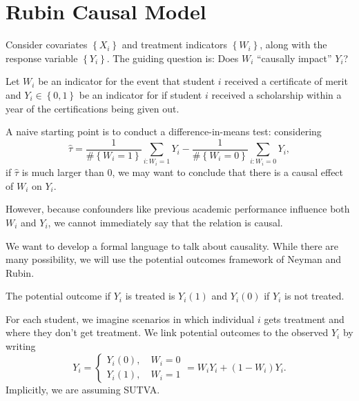 
\section{Rubin Causal Model}



Consider covariates $\left\{X_i\right\}$ and treatment indicators $\left\{W_i\right\}$, along with the response variable $\left\{Y_i\right\}$. The guiding question is: Does $W_i$ ``causally impact'' $Y_i$?

\begin{example}	Let $W_i$ be an indicator for the event that student $i$ received a certificate of merit and $Y_i \in \left\{0,1\right\}$ be an indicator for if student $i$ received a scholarship within a year of the certifications being given out.

	A naive starting point is to conduct a difference-in-means test: considering \[
		\hat{\tau} = \frac{1}{\# \left\{W_i = 1\right\}} \sum\limits_{i: W_i = 1}^{} Y_i - \frac{1}{\# \left\{W_i = 0\right\}} \sum\limits_{i: W_i = 0}^{} Y_i
	,\] 
	if $\hat{\tau}$ is much larger than $0$, we may want to conclude that there is a causal effect of $W_i$ on $Y_i$. 

	However, because confounders like previous academic performance influence both $W_i$ and $Y_i$, we cannot immediately say that the relation is causal.
\end{example}

We want to develop a formal language to talk about causality. While there are many possibility, we will use the potential outcomes framework of Neyman and Rubin.

\begin{definition}
	The potential outcome if $Y_i$ is treated is $Y_i(1)$ and $Y_i(0)$ if $Y_i$ is not treated. 

	For each student, we imagine scenarios in which individual $i$ gets treatment and where they don't get treatment. 
	We link potential outcomes to the observed $Y_i$ by writing \[
		Y_i = \begin{cases}
			Y_i(0), \quad W_i = 0 \\ Y_i(1), \quad W_i = 1
		\end{cases}= W_iY_i + (1-W_i) Y_i
	.\] Implicitly, we are assuming SUTVA.
\end{definition}


